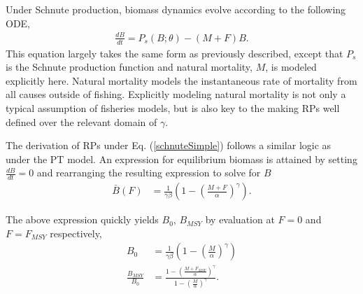 \documentclass[12pt]{article}
\begin{document}
%
Under Schnute production, biomass dynamics evolve according to the following ODE, 
%
\begin{align}
\frac{dB}{dt} = P_s(B;\theta) - (M+F)B. \label{schnuteSimple}
\end{align}
%
This equation largely takes the same form as previously described, except 
that $P_s$ is the Schnute production function and natural mortality, $M$, is modeled 
explicitly here. %
Natural mortality models the instantaneous rate of mortality from all causes 
outside of fishing. Explicitly modeling natural mortality is not 
only a typical assumption of fisheries models, but is also key to the making 
RPs well defined over the relevant domain of $\gamma$.



%
The derivation of RPs under Eq. (\ref{schnuteSimple}) follows a similar logic 
as under the PT model. An expression for equilibrium biomass is attained by 
setting $\frac{dB}{dt}=0$ and rearranging the resulting expression to solve 
for $B$ 
%
\begin{align}
\bar{B}(F) &= \frac{1}{\gamma \beta}\left(1-\left(\frac{M+F}{\alpha}\right)^\gamma\right).
\label{BsEq}
\end{align}

%
The above expression quickly yields $B_0$, $B_{MSY}$ by evaluation at $F=0$ and $F=F_{MSY}$ respectively,
\begin{align}
B_0 &= \frac{1}{\gamma \beta}\left(1-\left(\frac{M}{\alpha}\right)^\gamma\right) \label{B0S}\\
\frac{B_{MSY}}{B_0} &= \frac{1-\left(\frac{M+F_{MSY}}{\alpha}\right)^\gamma}{ 1-\left(\frac{M}{\alpha}\right)^\gamma }. \label{BratS}
\end{align}
\end{document}
